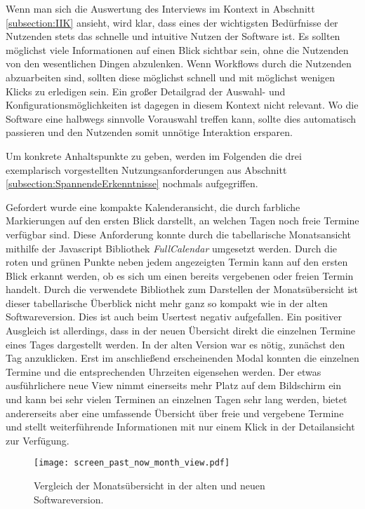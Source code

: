 Wenn man sich die Auswertung des Interviews im Kontext in Abschnitt
\ref{subsection:IIK} ansieht, wird klar, dass eines der wichtigsten Bedürfnisse
der Nutzenden stets das schnelle und intuitive Nutzen der Software ist. Es
sollten möglichst viele Informationen auf einen Blick sichtbar sein, ohne die
Nutzenden von den wesentlichen Dingen abzulenken. Wenn Workflows durch die
Nutzenden abzuarbeiten sind, sollten diese möglichst schnell und mit möglichst
wenigen Klicks zu erledigen sein. Ein großer Detailgrad der Auswahl- und
Konfigurationsmöglichkeiten ist dagegen in diesem Kontext nicht relevant. Wo
die Software eine halbwegs sinnvolle Vorauswahl treffen kann, sollte dies
automatisch passieren und den Nutzenden somit unnötige Interaktion ersparen.

Um konkrete Anhaltspunkte zu geben, werden im Folgenden die drei
exemplarisch vorgestellten Nutzungsanforderungen aus Abschnitt
\ref{subsection:SpannendeErkenntnisse} nochmals aufgegriffen.

Gefordert wurde eine kompakte Kalenderansicht, die durch farbliche
Markierungen auf den ersten Blick darstellt, an welchen Tagen noch freie
Termine verfügbar sind. Diese Anforderung konnte durch die tabellarische
Monatsansicht mithilfe der Javascript Bibliothek \textit{FullCalendar}
umgesetzt werden. Durch die roten und grünen Punkte neben jedem angezeigten
Termin kann auf den ersten Blick erkannt werden, ob es sich um einen
bereits vergebenen oder freien Termin handelt. Durch die verwendete Bibliothek
zum Darstellen der Monatsübersicht ist dieser tabellarische Überblick nicht
mehr ganz so kompakt wie in der alten Softwareversion. Dies ist auch \ipName
beim Usertest negativ aufgefallen. Ein positiver Ausgleich ist
allerdings, dass in der neuen Übersicht direkt die einzelnen Termine eines Tages
dargestellt werden. In der alten Version war es nötig, zunächst den Tag
anzuklicken. Erst im anschließend erscheinenden Modal konnten die einzelnen
Termine und die entsprechenden Uhrzeiten eigensehen werden. Der etwas
ausführlichere neue View nimmt einerseits mehr Platz auf dem Bildschirm ein und kann
bei sehr vielen Terminen an einzelnen Tagen sehr lang werden, bietet andererseits aber
eine umfassende Übersicht über freie und vergebene Termine und stellt
weiterführende Informationen mit nur einem Klick in der Detailansicht zur
Verfügung.

\begin{figure}[H]
    \caption{Vergleich der Monatsübersicht in der alten und neuen Softwareversion.}
    \centering
    \texttt{[image: screen\_past\_now\_month\_view.pdf]}
\end{figure}

